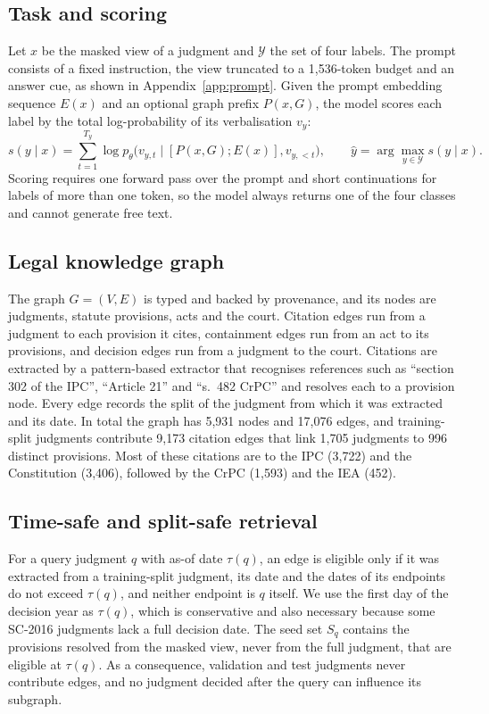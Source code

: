 \documentclass[11pt,a4paper]{article}
\begin{document}
\subsection{Task and scoring}
Let $x$ be the masked view of a judgment and $\mathcal{Y}$ the set of four labels. The prompt consists of a fixed instruction, the view truncated to a 1,536-token budget and an answer cue, as shown in Appendix~\ref{app:prompt}. Given the prompt embedding sequence $E(x)$ and an optional graph prefix $P(x,G)$, the model scores each label by the total log-probability of its verbalisation $v_y$:
\begin{equation}
s(y\mid x)=\sum_{t=1}^{T_y}\log p_\theta\bigl(v_{y,t}\mid [P(x,G);E(x)],v_{y,<t}\bigr),\qquad \hat y=\arg\max_{y\in\mathcal{Y}}s(y\mid x).
\end{equation}
Scoring requires one forward pass over the prompt and short continuations for labels of more than one token, so the model always returns one of the four classes and cannot generate free text.

\subsection{Legal knowledge graph}
The graph $G=(V,E)$ is typed and backed by provenance, and its nodes are judgments, statute provisions, acts and the court. Citation edges run from a judgment to each provision it cites, containment edges run from an act to its provisions, and decision edges run from a judgment to the court. Citations are extracted by a pattern-based extractor that recognises references such as ``section 302 of the IPC'', ``Article 21'' and ``s.~482 CrPC'' and resolves each to a provision node. Every edge records the split of the judgment from which it was extracted and its date. In total the graph has 5,931 nodes and 17,076 edges, and training-split judgments contribute 9,173 citation edges that link 1,705 judgments to 996 distinct provisions. Most of these citations are to the IPC (3,722) and the Constitution (3,406), followed by the CrPC (1,593) and the IEA (452).

\subsection{Time-safe and split-safe retrieval}
For a query judgment $q$ with as-of date $\tau(q)$, an edge is eligible only if it was extracted from a training-split judgment, its date and the dates of its endpoints do not exceed $\tau(q)$, and neither endpoint is $q$ itself. We use the first day of the decision year as $\tau(q)$, which is conservative and also necessary because some SC-2016 judgments lack a full decision date. The seed set $S_q$ contains the provisions resolved from the masked view, never from the full judgment, that are eligible at $\tau(q)$. As a consequence, validation and test judgments never contribute edges, and no judgment decided after the query can influence its subgraph.
\end{document}
